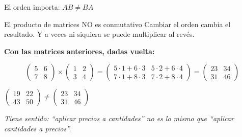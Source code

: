 \documentclass[aspectratio=169,10pt]{beamer}
\begin{document}
\begin{frame}{El orden importa: $AB \neq BA$}

\begin{alertblock}{El producto de matrices NO es conmutativo}
Cambiar el orden cambia el resultado. Y a veces ni siquiera se puede multiplicar al revés.
\end{alertblock}

\vspace{0.3cm}
\textbf{Con las matrices anteriores, dadas vuelta:}

$$\begin{pmatrix} 5 & 6 \\ 7 & 8 \end{pmatrix} \times
\begin{pmatrix} 1 & 2 \\ 3 & 4 \end{pmatrix} =
\begin{pmatrix} 5{\cdot}1 + 6{\cdot}3 & 5{\cdot}2 + 6{\cdot}4 \\
7{\cdot}1 + 8{\cdot}3 & 7{\cdot}2 + 8{\cdot}4 \end{pmatrix} =
\begin{pmatrix} 23 & 34 \\ 31 & 46 \end{pmatrix}$$

\vspace{0.3cm}
\begin{center}
$\begin{pmatrix} 19 & 22 \\ 43 & 50 \end{pmatrix} \neq \begin{pmatrix} 23 & 34 \\ 31 & 46 \end{pmatrix}$
\end{center}

\vspace{0.3cm}
\begin{center}
\textit{Tiene sentido: ``aplicar precios a cantidades'' no es lo mismo que ``aplicar cantidades a precios''.}
\end{center}
\end{frame}
\end{document}
